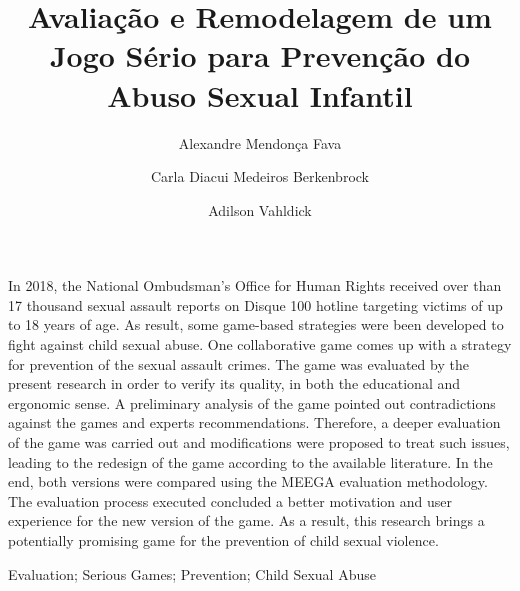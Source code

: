 \documentclass[alpha-refs,brazilian]{RBCA_v2.0}
\title{Avaliação e Remodelagem de um Jogo Sério para Prevenção do Abuso Sexual Infantil}
\author[1]{Alexandre Mendonça Fava \orcid{0000-0001-5605-2326}}
\author[1]{Carla Diacui Medeiros Berkenbrock \orcid{0000-0001-9854-4046}}
\author[1]{Adilson Vahldick \orcid{0000-0002-0442-3735}}
\affil[1]{Universidade do Estado de Santa Catarina - UDESC}
\begin{document}
\begin{frontmatter}
	
\maketitle
\thispagestyle{empty}


\begin{Abstract}                                            %
    In 2018, the National Ombudsman's Office for Human Rights received over than 17 thousand sexual assault reports on Disque 100 hotline targeting victims of up to 18 years of age. As result, some game-based strategies were been developed to fight against child sexual abuse. One collaborative game comes up with a strategy for prevention of the sexual assault crimes. The game was evaluated by the present research in order to verify its quality, in both the educational and ergonomic sense. A preliminary analysis of the game pointed out contradictions against the games and experts recommendations. Therefore, a deeper evaluation of the game was carried out and modifications were proposed to treat such issues, leading to the redesign of the game according to the available literature. In the end, both versions were compared using the MEEGA evaluation methodology. The evaluation process executed concluded a better motivation and user experience for the new version of the game. As a result, this research brings a potentially promising game for the prevention of child sexual violence.
\end{Abstract}

\begin{keywords}
    Evaluation; Serious Games; Prevention; Child Sexual Abuse
\end{keywords}


\end{frontmatter}
\end{document}
